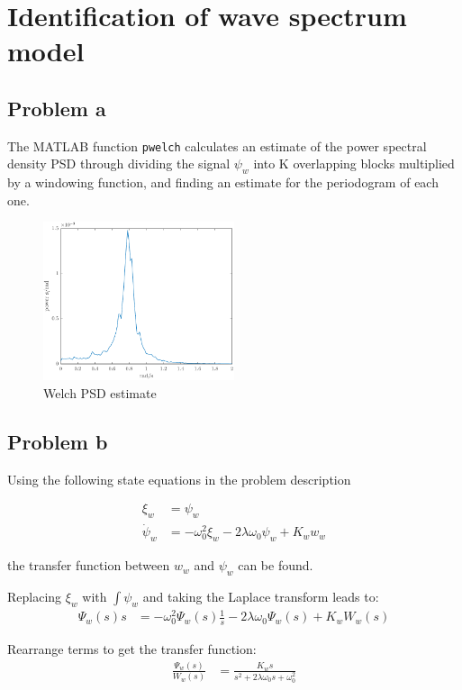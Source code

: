 \section{Identification of wave spectrum model}
\subsection{Problem a}
The MATLAB function \texttt{pwelch} calculates an estimate of the power spectral density PSD through
dividing the signal $\psi_w$ into K overlapping blocks multiplied by a windowing function, and finding an
estimate for the periodogram  of each one.

\begin{figure}[h]
    \centering
    \includegraphics[width=0.5\textwidth]{images/2a-welchPSDestimate}
    \caption{Welch PSD estimate}
    \label{fig:2a-welchPSDestimate}
\end{figure}

\subsection{Problem b}
Using the following state equations in the problem description \cite{assignment}

\begin{align*}
    \xi_w &= \psi_w \\
    \dot{\psi}_w &= -\omega^2_0\xi_w - 2\lambda\omega_0\psi_w + K_ww_w
\end{align*}

the transfer function between $w_w$ and $\psi_w$ can be found.

Replacing $\xi_w$ with $\int\psi_w$ and taking the Laplace transform leads to:
\begin{align*}
    \Psi_w(s)s &= -\omega^2_0\Psi_w(s)\frac{1}{s} - 2\lambda\omega_0\Psi_w(s) + K_wW_w(s)
\end{align*}

Rearrange terms to get the transfer function:
\begin{align*}
    \frac{\Psi_w(s)}{W_w(s)} &= \frac{K_ws}{s^2 + 2\lambda\omega_0s + \omega^2_0}
\end{align*}

